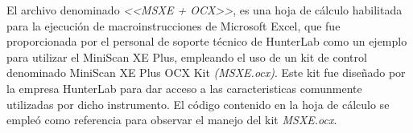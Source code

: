 			El archivo denominado \textit{<<MSXE + OCX>>}, es una hoja de c\'{a}lculo habilitada para la ejecuci\'{o}n de macroinstrucciones de Microsoft Excel, que fue proporcionada por el personal de soporte t\'{e}cnico de HunterLab como un ejemplo para utilizar el MiniScan XE Plus, empleando el uso de un kit de control denominado MiniScan XE Plus OCX Kit \textit{(MSXE.ocx)}. Este kit fue dise\~{n}ado por la empresa HunterLab para dar acceso a las caracteristicas comunmente utilizadas por dicho instrumento. El c\'{o}digo contenido en la hoja de c\'{a}lculo se emple\'{o} como referencia para observar el manejo del kit \textit{MSXE.ocx}.

		